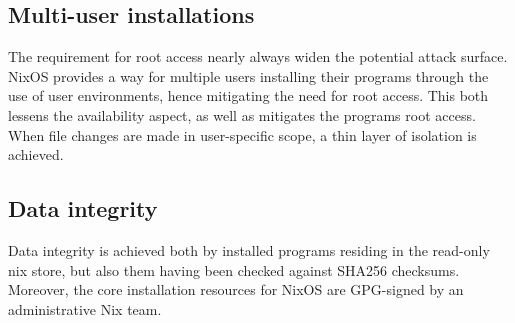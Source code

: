 \subsection{Multi-user installations}
The requirement for root access nearly always widen the potential
attack surface. NixOS provides a way for multiple users installing
their programs through the use of user environments, hence mitigating
the need for root access. This both lessens the availability aspect,
as well as mitigates the programs root access. When file changes are
made in user-specific scope, a thin layer of isolation is
achieved. \cite{nixosNixOSManual}

\subsection{Data integrity}
Data integrity is achieved both by installed programs residing in the
read-only nix store, but also them having been checked against SHA256
checksums. Moreover, the core installation resources for NixOS are
GPG-signed by an administrative Nix team. \cite{nixosSecurityNixOS}
